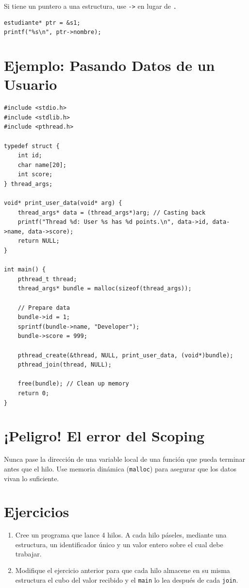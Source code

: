 \documentclass[12pt,a4paper]{article}
\begin{document}
Si tiene un puntero a una estructura, use \texttt{->} en lugar de \texttt{.}

\begin{lstlisting}
estudiante* ptr = &s1;
printf("%s\n", ptr->nombre);
\end{lstlisting}

\newpage

\section{Ejemplo: Pasando Datos de un Usuario}
\begin{lstlisting}
#include <stdio.h>
#include <stdlib.h>
#include <pthread.h>

typedef struct {
    int id;
    char name[20];
    int score;
} thread_args;

void* print_user_data(void* arg) {
    thread_args* data = (thread_args*)arg; // Casting back
    printf("Thread %d: User %s has %d points.\n", data->id, data->name, data->score);
    return NULL;
}

int main() {
    pthread_t thread;
    thread_args* bundle = malloc(sizeof(thread_args));

    // Prepare data
    bundle->id = 1;
    sprintf(bundle->name, "Developer");
    bundle->score = 999;

    pthread_create(&thread, NULL, print_user_data, (void*)bundle);
    pthread_join(thread, NULL);

    free(bundle); // Clean up memory
    return 0;
}
\end{lstlisting}

\section{¡Peligro! El error del Scoping}
Nunca pase la dirección de una variable local de una función que pueda terminar antes que el hilo. Use memoria dinámica (\texttt{malloc}) para asegurar que los datos vivan lo suficiente.

\section{Ejercicios}
\begin{enumerate}
    \item Cree un programa que lance 4 hilos. A cada hilo páseles, mediante una estructura, un identificador único y un valor entero sobre el cual debe trabajar.
    \item Modifique el ejercicio anterior para que cada hilo almacene en su misma estructura el cubo del valor recibido y el \texttt{main} lo lea después de cada \texttt{join}.
\end{enumerate}
\end{document}
